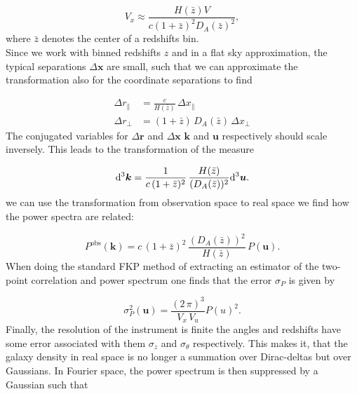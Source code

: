 \documentclass[../main.tex]{subfiles}
\begin{document}
\begin{equation*}
    V_x \approx \frac{H(\bar{z}) V}{c (1+\bar{z})^2 D_A(\bar{z})^2},
\end{equation*}
where $\bar{z}$ denotes the center of a redshifts bin.\\
Since we work with binned redshifts $z$ and in a flat sky approximation, the typical separations $\Delta \boldsymbol{x}$ are small, such that we can approximate the transformation also for the coordinate  separations to find 

\begin{align}
    \Delta r_\|  &= \frac{c}{H(\bar{z})}\, \Delta x_\| \\
    \Delta r_\perp &= (1+\bar{z})\, D_A(\bar{z})\, \Delta x_\perp
\end{align}
 The conjugated variables for $\Delta\boldsymbol{ r}$ and $\Delta\boldsymbol{x}$ $\boldsymbol{k}$ and $\boldsymbol{u}$ respectively should scale inversely. This leads to the transformation of the measure
 
 \begin{align}
    \mathrm{d}^3 \boldsymbol{k} = \frac{1}{c\,(1+\bar{z})^2} \, \frac{H(\bar{z})} {(D_A(\bar{z}))^2} \mathrm{d}^3 \boldsymbol{u}.
 \end{align}
 we can use the transformation from observation space to real space we find how the power spectra are related:
 
 \begin{equation}
    \label{eq:transform_power}
    P^\mathrm{obs}(\boldsymbol{k}) = c\,(1+\bar{z})^2\, \frac{(D_A(\bar{z}))^2}{H(\bar{z})}\,P(\boldsymbol{u}).
 \end{equation}
 When doing the standard FKP method of extracting an estimator of the two-point correlation and power spectrum one finds that the error $\sigma_P$ is given by 
 
 \begin{equation}
    \sigma^2_P(\boldsymbol{u})  = \frac{(2\,\pi)^3}{V_x\, V_u} P(u)^2.
 \end{equation}
 Finally, the resolution of the instrument is finite the angles and redshifts have some error associated with them $\sigma_z$ and $\sigma_\theta$ respectively. This makes it, that the galaxy density in real space is no longer a summation over Dirac-deltas but over Gaussians. In Fourier space, the power spectrum is then suppressed by a Gaussian such that
\end{document}
